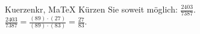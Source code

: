 \begin{MAufgabe}{Kuerzen}{kr, MaTeX}
K\"urzen Sie soweit m\"oglich: $\frac{2403}{7387}$.\\ 
\ifLsg\MLoesung
\quad $\frac{2403}{7387}=\frac{(89)\cdot(27)}{(89)\cdot(83)}=\frac{27}{83}$.\else\relax\fi
 \end{MAufgabe}